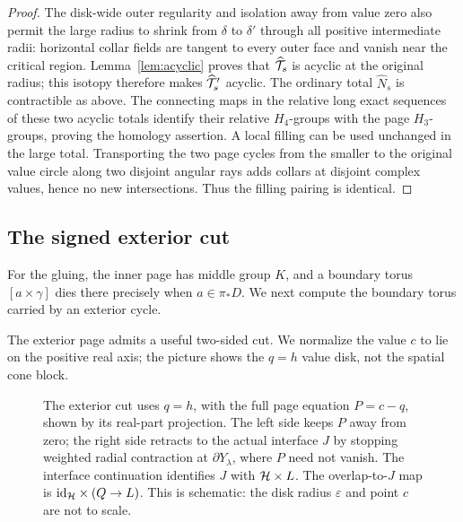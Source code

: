 \begin{proof}
The disk-wide outer regularity and isolation away from value zero
also permit the large radius to shrink from \(\delta\) to
\(\delta'\) through all positive intermediate radii: horizontal
collar fields are tangent to every outer face and vanish near the
critical region. Lemma~\ref{lem:acyclic} proves that
\(\widehat{\mathcal T}_s\) is acyclic at the original radius; this isotopy
therefore makes \(\widehat{\mathcal T}_s'\) acyclic. The ordinary total
\(\widehat N_s\) is contractible as above. The connecting maps in
the relative long exact sequences of these two acyclic totals identify
their relative \(H_4\)-groups with the page \(H_3\)-groups, proving
the homology assertion. A local filling can be used unchanged
in the large total. Transporting the two page cycles from the
smaller to the original value circle along two disjoint angular
rays adds collars at disjoint complex values, hence no new
intersections. Thus the filling pairing is identical.
\end{proof}

\subsection{The signed exterior cut}

For the gluing, the inner page has middle group \(K\), and a boundary torus
\([a\times\gamma]\) dies there precisely when \(a\in\pi_*D\).
We next compute the boundary torus carried by an exterior cycle.

The exterior page admits a useful two-sided cut. We normalize
the value \(c\) to lie on the positive real axis; the picture
shows the \(q=h\) value disk, not the spatial cone block.

\begin{figure}[ht]
\centering

\caption{The exterior cut uses \(q=h\), with the full page equation
\(P=c-q\), shown by its real-part projection. The left side keeps
\(P\) away from zero; the right
side retracts to the actual interface \(J\) by stopping weighted
radial contraction at \(\partial Y_\lambda\), where \(P\) need not
vanish. The interface continuation identifies \(J\) with
\(\mathcal H\times L\). The overlap-to-\(J\) map is
\(\mathrm{id}_{\mathcal H}\times(Q\to L)\). This is schematic:
the disk radius \(\varepsilon\) and point \(c\) are not to scale.}
\label{fig:split}
\end{figure}

